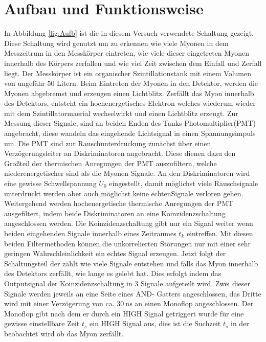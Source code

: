 \section{Aufbau und Funktionsweise}

    In Abbildung \ref{fig:Aufb} ist die in diesem Versuch verwendete Schaltung gezeigt.
    Diese Schaltung wird genutzt um zu erkennen wie viele Myonen in dem Messzeitrum in den Messkörper eintreten, wie viele dieser eingetreten Myonen innerhalb des Körpers zerfallen und wie viel Zeit zwischen dem Einfall und Zerfall liegt.
    Der Messkörper ist ein organischer Szintillationstank mit einem Volumen von ungefähr 50 Litern.
    Beim Eintreten der Myonen in den Detektor, werden die Myonen abgebremst und erzeugen einen Lichtblitz.
    Zerfällt das Myon innerhalb des Detektors, entsteht ein hochenergetisches Elektron welches wiederum wieder mit dem Szintillatormaerial wechselwirkt und einen Lichtblitz erzeugt.
    Zur Messung dieser Signale, sind an beiden Enden des Tanks Photomultiplier(PMT) angebracht, diese wandeln das eingehende Lichtsignal in einen Spannungsimpuls um. 
    Die PMT sind zur Rauschunterdrückung zunächst über einen Verzögerungsleiter an Diskriminatoren angebracht.
    Diese dienen dazu den Großteil der thermischen Anregungen der PMT auszufiltern, welche niederenergetischer sind als die Myonen Signale.
    An den Diskriminatoren wird eine gewisse Schwellspannung $U_0$ eingestellt, damit möglichst viele Rauschsignale unterdrückt werden aber auch möglichst keine \"echten\" Signale verloren gehen.
    Weitergehend werden hochenergetische thermische Anregungen der PMT ausgefiltert, indem beide Diskriminatoren an eine Koinzidenzschaltung angeschlossen werden.
    Die Koinzidenzschaltung gibt nur ein Signal weiter wenn beiden eingehenden Signale innerhalb eines Zeitraumes $t_k$ eintreffen. 
    Mit diesen beiden Filtermethoden können die unkorrelierten Störungen nur mit einer sehr geringen Wahrschleinlichkeit ein echtes Signal erzeugen.
    Jetzt folgt der Schaltungsteil der zählt wie viele Signale entstehen und falls das Myon innerhalb des Detektors zerfällt, wie lange es gelebt hat.
    Dies erfolgt indem das Outputsignal der Koinzidenzschaltung in 3 Signale aufgeteilt wird.
    Zwei dieser Signale werden jeweils an eine Seite eines AND- Gatters angeschlossen, das Dritte wird mit einer Verzögerung von ca. $\SI{30}{\nano\second}$ an einen Monoflop angeschlossen.
    Der Monoflop gibt nach dem er durch ein HIGH Signal getriggert wurde für eine gewisse einstellbare Zeit $t_s$ ein HIGH Signal aus, dies ist die Suchzeit $t_s$ in der beobachtet wird ob das Myon zerfällt.
